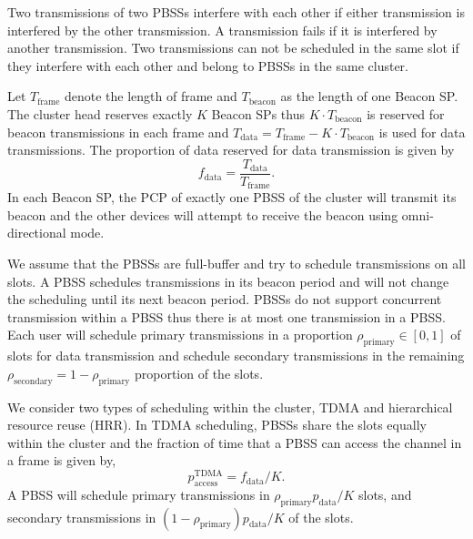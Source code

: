 \documentclass[10pt, conference, letterpaper]{IEEEtran}
\begin{document}
Two transmissions of two PBSSs interfere with each other if either transmission is interfered by the other transmission. 
A transmission fails if it is interfered by another transmission. 
Two transmissions can not be scheduled in the same slot if they interfere with each other and belong to PBSSs in the same cluster.

Let $T_{\mathrm{frame}}$ denote the length of frame and $T_{\mathrm{beacon}}$ as the length of one Beacon SP. 
The cluster head reserves exactly $K$ Beacon SPs thus $K\cdot T_{\mathrm{beacon}}$ is reserved for beacon transmissions in each frame and $T_{\mathrm{data}} = T_{\mathrm{frame}} - K\cdot T_{\mathrm{beacon}}$ is used for data transmissions. 
The proportion of data reserved for data transmission is given by
\begin{equation*}
f_{\mathrm{data}} = \frac{T_{\mathrm{data}}}{T_{\mathrm{frame}}}.
\end{equation*}
In each Beacon SP, the PCP of exactly one PBSS of the cluster will transmit its beacon and the other devices will attempt to receive the beacon using omni-directional mode. 

We assume that the PBSSs are full-buffer and try to schedule transmissions on all slots. 
A PBSS schedules transmissions in its beacon period and will not change the scheduling until its next beacon period. 
PBSSs do not support concurrent transmission within a PBSS thus there is at most one transmission in a PBSS. 
Each user will schedule primary transmissions in a proportion $\rho_{\mathrm{primary}}\in[0,1]$ of slots for data transmission and schedule secondary transmissions in the remaining $\rho_{\mathrm{secondary}} =1 - \rho_{\mathrm{primary}}$ proportion of the slots. 

We consider two types of scheduling within the cluster, TDMA and hierarchical resource reuse (HRR). In TDMA scheduling, PBSSs share the slots equally within the cluster and the fraction of time that a PBSS can access the channel in a frame is given by, 
\begin{equation*}
p_{\mathrm{access}}^{\mathrm{TDMA}} = f_{\mathrm{data}}/K.
\end{equation*}
A PBSS will schedule primary transmissions in $\rho_{\mathrm{primary}}p_{\mathrm{data}}/K$ slots, and secondary transmissions in $(1-\rho_{\mathrm{primary}})p_{\mathrm{data}}/K$ of the slots. 
\end{document}
